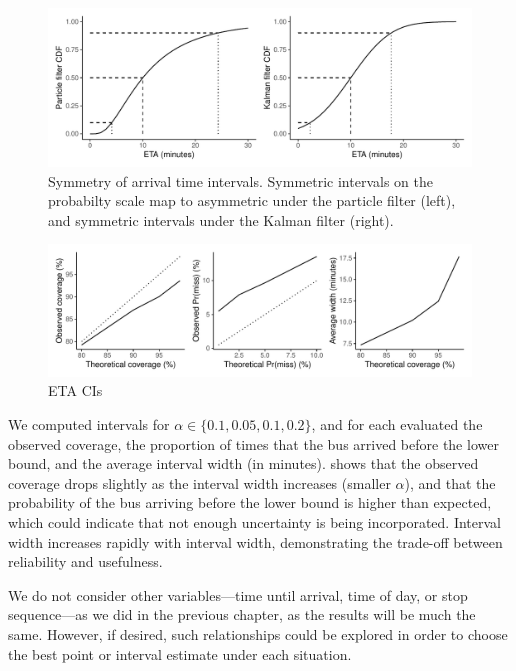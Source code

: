 \begin{knitrout}\small
{}\color{fgcolor}\begin{figure}

{\centering \includegraphics[width=\textwidth]{figure/eta_dist_skew-1} 

}

\caption[Symmetry of arrival time intervals]{Symmetry of arrival time intervals. Symmetric intervals on the probabilty scale map to asymmetric under the particle filter (left), and symmetric intervals under the Kalman filter (right).}\label{fig:eta_dist_skew}
\end{figure}


\end{knitrout}


\begin{knitrout}\small
{}\color{fgcolor}\begin{figure}

{\centering \includegraphics[width=\textwidth]{figure/eta_cis-1} 

}

\caption[ETA CIs]{ETA CIs}\label{fig:eta_cis}
\end{figure}


\end{knitrout}




We computed intervals for $\alpha \in \{0.1, 0.05, 0.1, 0.2\}$, and for each evaluated the observed coverage, the proportion of times that the bus arrived before the lower bound, and the average interval width (in minutes).  shows that the observed coverage drops slightly as the interval width increases (smaller $\alpha$), and that the probability of the bus arriving before the lower bound is higher than expected, which could indicate that not enough uncertainty is being incorporated. Interval width increases rapidly with interval width, demonstrating the trade-off between reliability and usefulness.


We do not consider other variables---time until arrival, time of day, or stop sequence---as we did in the previous chapter, as the results will be much the same. However, if desired, such relationships could be explored in order to choose the best point or interval estimate under each situation.
